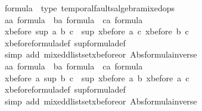 \begin{isabellebody}
{}
\isamarkuptrue%
\isamarkupfalse%
\ formula\ {\isacharcolon}{\isacharcolon}\ {\isacharparenleft}type{\isacharparenright}\ temporal{\isacharunderscore}faults{\isacharunderscore}algebra{\isacharunderscore}mixed{\isacharunderscore}ops\isanewline
{}\isanewline
{}\isamarkupfalse%
%
\isadelimproof
\ %
\endisadelimproof
%
\isatagproof
{}\isamarkupfalse%
\isanewline
\ \ \isamarkupfalse%
\ a{\isacharcolon}{\isacharcolon}{\isachardoublequoteopen}{\isacharprime}a\ formula{\isachardoublequoteclose}\ \ b{\isacharcolon}{\isacharcolon}{\isachardoublequoteopen}{\isacharprime}a\ formula{\isachardoublequoteclose}\ \ c{\isacharcolon}{\isacharcolon}{\isachardoublequoteopen}{\isacharprime}a\ formula{\isachardoublequoteclose}\isanewline
\ \ \isamarkupfalse%
\ {\isachardoublequoteopen}xbefore\ {\isacharparenleft}sup\ a\ b{\isacharparenright}\ c\ {\isacharequal}\ sup\ {\isacharparenleft}xbefore\ a\ c{\isacharparenright}\ {\isacharparenleft}xbefore\ b\ c{\isacharparenright}{\isachardoublequoteclose}\isanewline
\ \ \isamarkupfalse%
\ xbefore{\isacharunderscore}formula{\isacharunderscore}def\ sup{\isacharunderscore}formula{\isacharunderscore}def\isanewline
\ \ \isamarkupfalse%
\ {\isacharparenleft}simp\ add{\isacharcolon}\ mixed{\isacharunderscore}dlistset{\isacharunderscore}xbefore{\isacharunderscore}or{}\ Abs{\isacharunderscore}formula{\isacharunderscore}inverse{\isacharparenright}\isanewline
\ \ \isamarkupfalse%
\isanewline
\ \ \isamarkupfalse%
\ a{\isacharcolon}{\isacharcolon}{\isachardoublequoteopen}{\isacharprime}a\ formula{\isachardoublequoteclose}\ \ b{\isacharcolon}{\isacharcolon}{\isachardoublequoteopen}{\isacharprime}a\ formula{\isachardoublequoteclose}\ \ c{\isacharcolon}{\isacharcolon}{\isachardoublequoteopen}{\isacharprime}a\ formula{\isachardoublequoteclose}\isanewline
\ \ \isamarkupfalse%
\ {\isachardoublequoteopen}xbefore\ a\ {\isacharparenleft}sup\ b\ c{\isacharparenright}\ {\isacharequal}\ sup\ {\isacharparenleft}xbefore\ a\ b{\isacharparenright}\ {\isacharparenleft}xbefore\ a\ c{\isacharparenright}{\isachardoublequoteclose}\isanewline
\ \ \isamarkupfalse%
\ xbefore{\isacharunderscore}formula{\isacharunderscore}def\ sup{\isacharunderscore}formula{\isacharunderscore}def\isanewline
\ \ \isamarkupfalse%
\ {\isacharparenleft}simp\ add{\isacharcolon}\ mixed{\isacharunderscore}dlistset{\isacharunderscore}xbefore{\isacharunderscore}or{}\ Abs{\isacharunderscore}formula{\isacharunderscore}inverse{\isacharparenright}\isanewline

\end{isabellebody}
